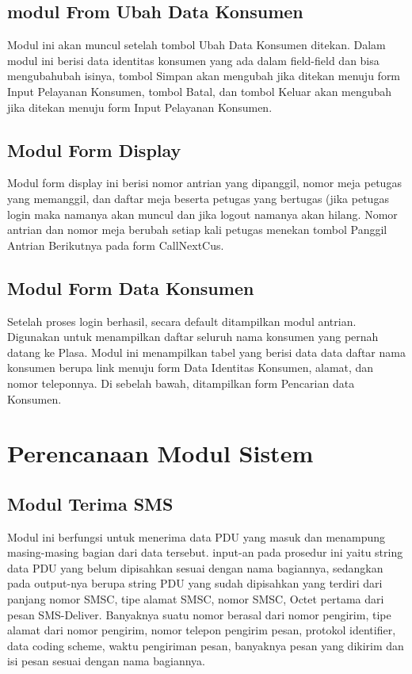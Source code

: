 \documentclass[12pt,a4paper]{article}
\begin{document}
\subsection{modul From Ubah Data Konsumen}
Modul ini akan muncul setelah tombol Ubah Data Konsumen ditekan. Dalam modul ini berisi data identitas konsumen yang ada dalam field-field dan bisa mengubahubah isinya, tombol Simpan akan mengubah jika ditekan menuju form Input Pelayanan Konsumen, tombol Batal, dan tombol Keluar akan mengubah jika ditekan menuju form Input Pelayanan Konsumen.
\subsection{Modul Form Display}
Modul form display ini berisi nomor antrian yang dipanggil, nomor meja petugas yang memanggil, dan daftar meja beserta petugas yang bertugas (jika petugas login maka namanya akan muncul dan jika logout namanya akan hilang. Nomor antrian dan nomor meja berubah setiap kali petugas menekan tombol Panggil Antrian Berikutnya pada form CallNextCus.
\subsection{Modul Form Data Konsumen}
Setelah proses login berhasil, secara default ditampilkan modul antrian. Digunakan untuk menampilkan daftar seluruh nama konsumen yang pernah datang ke Plasa. Modul ini menampilkan tabel yang berisi data data daftar nama konsumen berupa link menuju form Data Identitas Konsumen, alamat, dan nomor teleponnya. Di sebelah bawah, ditampilkan form  Pencarian data Konsumen.


\section{Perencanaan Modul Sistem}
\subsection{Modul Terima SMS}
Modul ini berfungsi untuk menerima data PDU yang masuk dan menampung masing-masing bagian dari data tersebut.
input-an pada prosedur ini yaitu string data PDU yang belum dipisahkan sesuai dengan nama bagiannya, sedangkan pada output-nya
berupa string PDU yang sudah dipisahkan yang terdiri dari panjang nomor SMSC, tipe alamat
SMSC, nomor SMSC, Octet pertama dari pesan SMS-Deliver. Banyaknya suatu nomor berasal dari nomor pengirim, tipe alamat dari nomor pengirim, nomor telepon pengirim pesan, protokol identifier, data coding scheme, waktu pengiriman pesan, banyaknya
pesan yang dikirim dan isi pesan sesuai dengan nama bagiannya. 
\end{document}
